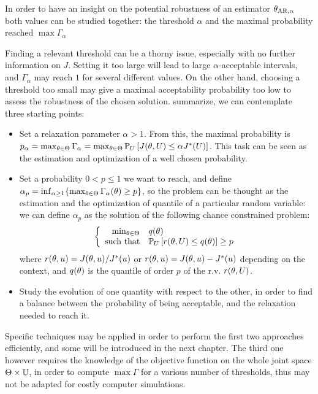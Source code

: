 \documentclass[../../Main_ManuscritThese.tex]{subfiles}
\begin{document}
  In order to have an insight on the potential robustness of an estimator ${\theta}_{\mathrm{AR,\alpha}}$ both values can be studied together: the threshold $\alpha$ and the maximal probability reached $\max \Gamma_\alpha$

  
  Finding a relevant threshold can be a thorny issue, especially with no further information on $J$. Setting it too large will lead to large $\alpha$-acceptable intervals, and $\Gamma_\alpha$  may reach $1$ for several different values. On the other hand, choosing a threshold too small may give a maximal acceptability probability too low to assess the robustness of the chosen solution.
 summarize, we can contemplate three starting points:
 \begin{itemize}
\item Set a relaxation parameter $\alpha > 1$. From this, the maximal probability is $p_{\alpha} = \max_{\theta\in\Theta} \Gamma_{\alpha} = \max_{\theta\in\Theta} \mathbb{P}_{U}\left[J(\theta, U) \leq \alpha J^*(U)\right]$. This task can be seen as the estimation and optimization of a well chosen probability.

   
\item Set a probability $0< p\leq 1 $ we want to reach, and define $\alpha_p = \inf_{\alpha \geq 1}\{\max_{\theta \in \Theta}\Gamma_{\alpha}(\theta)\geq p \}$, so the problem can be thought as the estimation and the optimization of quantile of a particular random variable: we can define $\alpha_p$ as the solution of the following chance constrained problem:
 \begin{equation}
  \left\{
  \begin{array}{rl}
    \min_{\theta\in\Theta} &  q(\theta) \\
  \text{such that} & \mathbb{P}_{U}\left[r(\theta, U) \leq q(\theta) \right] \geq p
  \end{array}
  \right.
\end{equation}
where $r(\theta, u) = J(\theta, u)/J^*(u)$ or $r(\theta, u)=J(\theta, u) - J^*(u)$ depending on the context, and $q(\theta)$ is the quantile of order $p$ of the r.v. $r(\theta, U)$.



\item Study the evolution of one quantity with respect to the other, in order to find a balance between the probability of being acceptable, and the relaxation needed to reach it.
\end{itemize}

Specific techniques may be applied in order to perform the first two approaches efficiently, and some will be introduced in the next chapter. The third one however requires the knowledge of the objective function on the whole joint space $\Theta \times \mathbb{U}$, in order to compute $\max \Gamma$ for a various number of thresholds, thus may not be adapted for costly computer simulations.
\end{document}
